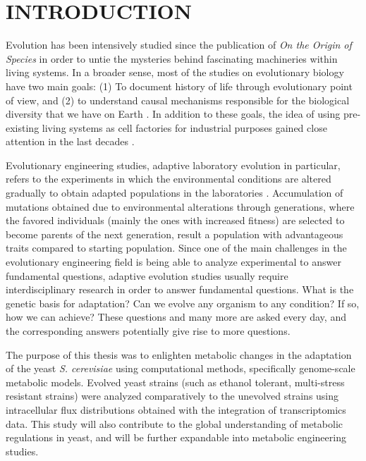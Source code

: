 \chapter{INTRODUCTION}
Evolution has been intensively studied since the publication of \emph{On the Origin of Species} in order to untie the mysteries behind fascinating machineries within living systems. In a broader sense, most of the studies on evolutionary biology have two main goals: (1) To document history of life through evolutionary point of view, and (2) to understand causal mechanisms responsible for the biological diversity that we have on Earth \cite{futuyma2001evolution, hird2017evolutionary}. In addition to these goals, the idea of using pre-existing living systems as cell factories for industrial purposes gained close attention in the last decades \cite{nielsen2016engineering}.

Evolutionary engineering studies, adaptive laboratory evolution in particular, refers to the experiments in which the environmental conditions are altered gradually to obtain adapted populations in the laboratories \cite{garland2009experimental}. Accumulation of mutations obtained due to environmental alterations through generations, where the favored individuals (mainly the ones with increased fitness) are selected to become parents of the next generation, result a population with advantageous traits compared to starting population. Since one of the main challenges in the evolutionary engineering field is being able to analyze experimental to answer fundamental questions, adaptive evolution studies usually require interdisciplinary research in order to answer fundamental questions. What is the genetic basis for adaptation? Can we evolve any organism to any condition? If so, how we can achieve? These questions and many more are asked every day, and the corresponding answers potentially give rise to more questions.

The purpose of this thesis was to enlighten metabolic changes in the adaptation of the yeast \emph{S. cerevisiae} using computational methods, specifically genome-scale metabolic models. Evolved yeast strains (such as ethanol tolerant, multi-stress resistant strains) were analyzed comparatively to the unevolved strains using intracellular flux distributions obtained with the integration of transcriptomics data. This study will also contribute to the global understanding of metabolic regulations in yeast, and will be further expandable into metabolic engineering studies.

